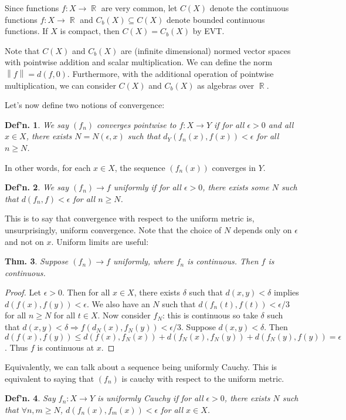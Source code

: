 \documentclass[12pt, a4paper]{book}
\DeclareMathOperator{\R}{\mathbb{R}}
\newcommand{\norm}[1]{\left\lVert#1\right\rVert} %
\newtheorem{theorem}{Thm.}[section]
\newtheorem{definition}[theorem]{Def'n.}
\theoremstyle{nonumberplain}
\newtheorem{proof}{Proof}
\begin{document}
Since functions $f:X\to\R$ are very common, let $C(X)$ denote the continuous functions $f:X\to\R$ and $C_b(X)\subseteq C(X)$ denote bounded continuous functions.
If $X$ is compact, then $C(X)=C_b(X)$ by EVT.

Note that $C(X)$ and $C_b(X)$ are (infinite dimensional) normed vector spaces with pointwise addition and scalar multiplication.
We can define the norm $\norm{f}=d(f,0)$.
Furthermore, with the additional operation of pointwise multiplication, we can consider $C(X)$ and $C_b(X)$ as algebras over $\R$.

Let's now define two notions of convergence:
\begin{definition}
    We say $(f_n)$ converges pointwise to $f:X\to Y$ if for all $\epsilon>0$ and all $x\in X$, there exists $N=N(\epsilon,x)$
    such that $d_Y(f_n(x),f(x))<\epsilon$ for all $n\geq N$.
\end{definition}
In other words, for each $x\in X$, the sequence $(f_n(x))$ converges in $Y$.
\begin{definition}
    We say $(f_n)\to f$ uniformly if for all $\epsilon>0$, there exists some $N$ such that $d(f_n,f)<\epsilon$ for all $n\geq N$.
\end{definition}
This is to say that convergence with respect to the uniform metric is, unsurprisingly, uniform convergence.
Note that the choice of $N$ depends only on $\epsilon$ and not on $x$.
Uniform limits are useful:
\begin{theorem}
    Suppose $(f_n)\to f$ uniformly, where $f_n$ is continuous.
    Then $f$ is continuous.
\end{theorem}
\begin{proof}
    Let $\epsilon>0$. Then for all $x\in X$, there exists $\delta$ such that $d(x,y)<\delta$ implies $d(f(x),f(y))<\epsilon$.
    We also have an $N$ such that $d(f_n(t),f(t))<\epsilon/3$ for all $n\geq N$ for all $t\in X$. Now consider $f_N$:
    this is continuous so take $\delta$ such that $d(x,y)<\delta\Rightarrow f(d_N(x),f_N(y))<\epsilon/3$. Suppose
    $d(x,y)<\delta$. Then $d(f(x),f(y))\leq d(f(x),f_N(x))+d(f_N(x),f_N(y))+d(f_N(y),f(y))=\epsilon$. Thus $f$ is continuous
    at $x$.
\end{proof}
Equivalently, we can talk about a sequence being uniformly Cauchy.
This is equivalent to saying that $(f_n)$ is cauchy with respect to the uniform metric.
\begin{definition}
    Say $f_n:X\to Y$ is uniformly Cauchy if for all $\epsilon>0$, there exists $N$ such that $\forall n,m\geq N$,
    $d(f_n(x),f_m(x))<\epsilon$ for all $x\in X$.
\end{definition}
\end{document}
